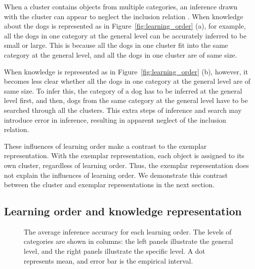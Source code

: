 \documentclass[doc]{apa6}
\begin{document}
When a cluster contains objects from multiple categories, an inference drawn with the cluster can
appear to neglect the inclusion relation \parencite[e.g.,][]{Sloman1998a}.  When knowledge about the
dogs is represented as in Figure~\ref{fig:learning_order} (a), for example, all the dogs in one
category at the general level can be accurately inferred to be small or large. This is because all
the dogs in one cluster fit into the same category at the general level, and all the dogs in one
cluster are of same size.

When knowledge is represented as in Figure~\ref{fig:learning_order} (b), however, it becomes less
clear whether all the dogs in one category at the general level are of same size. To infer this, the
category of a dog has to be inferred at the general level first, and then, dogs from the same
category at the general level have to be searched through all the clusters. This extra steps of
inference and search may introduce error in inference, resulting in apparent neglect of the
inclusion relation.

These influences of learning order make a contrast to the exemplar representation.  With the exemplar
representation, each object is assigned to its own cluster, regardless of learning order. Thus, the
exemplar representation does not explain the influences of learning order. We demonstrate this
contrast between the cluster and exemplar representations in the next section.


\subsection*{Learning order and knowledge representation}

\begin{figure}
    \centering



    \vspace{10pt}

    \caption{The average inference accuracy for each learning order.  The levels of categories are
    shown in columns: the left panels illustrate the general level, and the right panels illustrate
    the specific level.   A dot represents mean, and error bar is the empirical interval.}

\label{fig:result2}
\end{figure}
\end{document}
